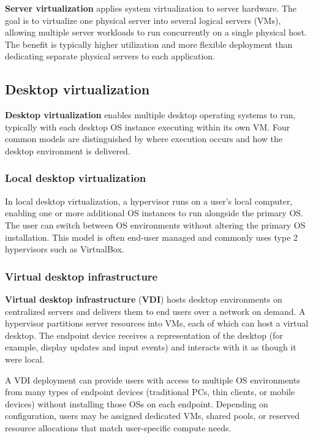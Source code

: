 \documentclass[11pt,a4paper,openany]{report}
\begin{document}
\textbf{Server virtualization} applies system virtualization to server hardware. The goal is to virtualize one physical server into several logical servers (VMs), allowing multiple server workloads to run concurrently on a single physical host. The benefit is typically higher utilization and more flexible deployment than dedicating separate physical servers to each application.

\subsection{Desktop virtualization}

\textbf{Desktop virtualization} enables multiple desktop operating systems to run, typically with each desktop OS instance executing within its own VM. Four common models are distinguished by where execution occurs and how the desktop environment is delivered.

\subsubsection*{Local desktop virtualization}

In local desktop virtualization, a hypervisor runs on a user's local computer, enabling one or more additional OS instances to run alongside the primary OS. The user can switch between OS environments without altering the primary OS installation. This model is often end-user managed and commonly uses type 2 hypervisors such as VirtualBox.

\subsubsection*{Virtual desktop infrastructure}

\textbf{Virtual desktop infrastructure} (\textbf{VDI}) hosts desktop environments on centralized servers and delivers them to end users over a network on demand. A hypervisor partitions server resources into VMs, each of which can host a virtual desktop. The endpoint device receives a representation of the desktop (for example, display updates and input events) and interacts with it as though it were local.

A VDI deployment can provide users with access to multiple OS environments from many types of endpoint devices (traditional PCs, thin clients, or mobile devices) without installing those OSs on each endpoint. Depending on configuration, users may be assigned dedicated VMs, shared pools, or reserved resource allocations that match user-specific compute needs.
\end{document}
